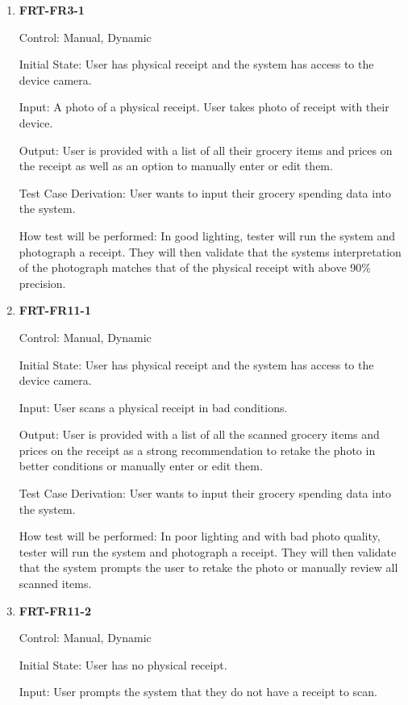 \documentclass[12pt, titlepage]{article}
\begin{document}
\begin{enumerate}

\item{\textbf{FRT-FR3-1}}

Control: Manual, Dynamic
          
Initial State: User has physical receipt and the system has access to the device camera.
          
Input: A photo of a physical receipt. User takes photo of receipt with their device.
          
Output: User is provided with a list of all their grocery items and prices on the receipt as well as an option to manually enter or edit them.

Test Case Derivation: User wants to input their grocery spending data into the system.
          
How test will be performed: In good lighting, tester will run the system and photograph a receipt. They will then validate that the systems interpretation of the photograph matches that of the physical receipt with above 90\% precision.

\item{\textbf{FRT-FR11-1}}

Control: Manual, Dynamic
          
Initial State: User has physical receipt and the system has access to the device camera.

Input: User scans a physical receipt in bad conditions.
          
Output: User is provided with a list of all the scanned grocery items and prices on the receipt as a strong recommendation to retake the photo in better conditions or manually enter or edit them.

Test Case Derivation: User wants to input their grocery spending data into the system.
          
How test will be performed: In poor lighting and with bad photo quality, tester will run the system and photograph a receipt. They will then validate that the system prompts the user to retake the photo or manually review all scanned items.

\item{\textbf{FRT-FR11-2}}

Control: Manual, Dynamic
          
Initial State: User has no physical receipt.

Input: User prompts the system that they do not have a receipt to scan.
          

\end{enumerate}
\end{document}
